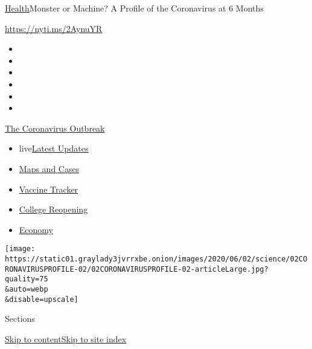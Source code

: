 \href{/section/health}{Health}\textbar{}Monster or Machine? A Profile of
the Coronavirus at 6 Months

\href{https://nyti.ms/2AynuYR}{https://nyti.ms/2AynuYR}

\begin{itemize}
\item
\item
\item
\item
\item
\item
\end{itemize}

\href{https://www.nytimes3xbfgragh.onion/news-event/coronavirus?action=click\&pgtype=Article\&state=default\&region=TOP_BANNER\&context=storylines_menu}{The
Coronavirus Outbreak}

\begin{itemize}
\tightlist
\item
  live\href{https://www.nytimes3xbfgragh.onion/2020/08/04/world/coronavirus-cases.html?action=click\&pgtype=Article\&state=default\&region=TOP_BANNER\&context=storylines_menu}{Latest
  Updates}
\item
  \href{https://www.nytimes3xbfgragh.onion/interactive/2020/us/coronavirus-us-cases.html?action=click\&pgtype=Article\&state=default\&region=TOP_BANNER\&context=storylines_menu}{Maps
  and Cases}
\item
  \href{https://www.nytimes3xbfgragh.onion/interactive/2020/science/coronavirus-vaccine-tracker.html?action=click\&pgtype=Article\&state=default\&region=TOP_BANNER\&context=storylines_menu}{Vaccine
  Tracker}
\item
  \href{https://www.nytimes3xbfgragh.onion/2020/08/02/us/covid-college-reopening.html?action=click\&pgtype=Article\&state=default\&region=TOP_BANNER\&context=storylines_menu}{College
  Reopening}
\item
  \href{https://www.nytimes3xbfgragh.onion/live/2020/08/04/business/stock-market-today-coronavirus?action=click\&pgtype=Article\&state=default\&region=TOP_BANNER\&context=storylines_menu}{Economy}
\end{itemize}

\texttt{[image: https://static01.graylady3jvrrxbe.onion/images/2020/06/02/science/02CORONAVIRUSPROFILE-02/02CORONAVIRUSPROFILE-02-articleLarge.jpg?quality=75\\\&auto=webp\\\&disable=upscale]}

Sections

\protect\hyperlink{site-content}{Skip to
content}\protect\hyperlink{site-index}{Skip to site index}

